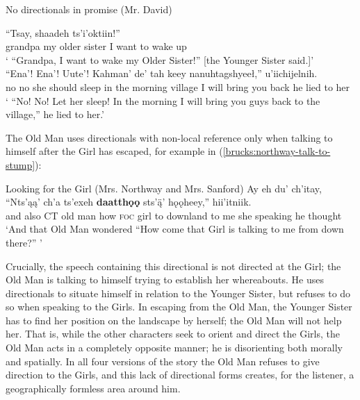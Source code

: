 \begin{exe}
\ex No directionals in promise (Mr. David) \label{brucks:david-return}
\begin{xlist}

\ex \gll ``Tsay, shaadeh ts'i'oktiin!''  \\
 grandpa {my older sister} {I want to wake up} \\
\glt ` ``Grandpa, I want to wake my Older Sister!'' [the Younger Sister said.]' \\

\ex \gll ``Ena'! Ena'! Uute'! {Kahman' de' tah} keey nanuhtagshyeeł,'' u'iichijelnih.  \\
 no no {she should sleep} {in the morning} village {I will bring you back} {he lied to her} \\
\glt ` ``No! No! Let her sleep! In the morning I will bring you guys back to the village,'' he lied to her.' \\
\end{xlist}
\end{exe}

The Old Man uses directionals with non-local reference only when talking to himself after the Girl has escaped, for example in (\ref{brucks:northway-talk-to-stump}):

\begin{exe}
\ex Looking for the Girl (Mrs. Northway and Mrs. Sanford) \label{brucks:northway-talk-to-stump}
\gll Ay eh du' ch'itay, ``Nts'ąą' ch'a ts'exeh \textbf{daatthǫǫ} sts'ą̈' hǫǫheey,'' hii'itniik. \\
 and also CT {old man} how \textsc{foc} girl {to downland} {to me} {she speaking} {he thought}\\
\glt `And that Old Man wondered ``How come that Girl is talking to me from down there?'' ' \\
\end{exe}

Crucially, the speech containing this directional is not directed at the Girl; the Old Man is talking to himself trying to establish her whereabouts. He uses directionals to situate himself in relation to the Younger Sister, but refuses to do so when speaking to the Girls. In escaping from the Old Man, the Younger Sister has to find her position on the landscape by herself; the Old Man will not help her. That is, while the other characters seek to orient and direct the Girls, the Old Man acts in a completely opposite manner; he is disorienting both morally and spatially. In all four versions of the story the Old Man refuses to give direction to the Girls, and this lack of directional forms creates, for the listener, a geographically formless area around him.

